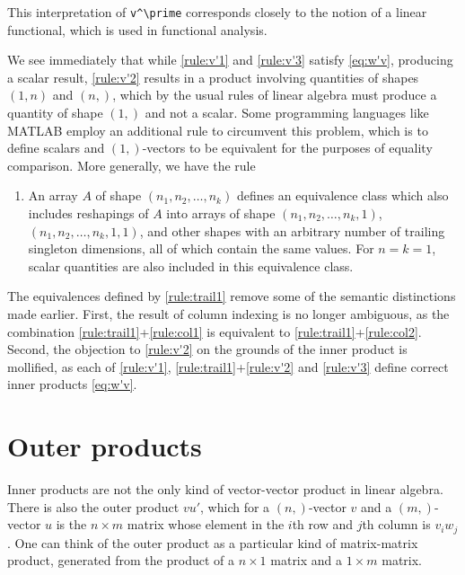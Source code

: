 This interpretation of \lstinline|v^\prime| corresponds closely to the notion of a
linear functional, which is used in functional analysis.

We see immediately that while \ref{rule:v'1} and \ref{rule:v'3} satisfy
\eqref{eq:w'v}, producing a scalar result, \ref{rule:v'2} results in a product
involving quantities of shapes $(1,n)$ and $(n,)$, which by the usual rules of
linear algebra must produce a quantity of shape $(1,)$ and not a scalar. Some
programming languages like MATLAB employ an additional rule to circumvent this
problem, which is to define scalars and $(1,)$-vectors to be equivalent for the
purposes of equality comparison. More generally, we have the rule

\begin{enumerate}[label=\bfseries{}I\arabic*]
\item An array $A$ of shape $(n_1, n_2, \dots, n_k)$ defines an equivalence
class which also includes reshapings of $A$ into arrays of shape $(n_1, n_2,
\dots, n_k, 1)$, $(n_1, n_2, \dots, n_k, 1, 1)$, and other shapes with an
arbitrary number of trailing singleton dimensions, all of which contain the
same values. For $n = k = 1$, scalar quantities are also included in this
equivalence class.\label{rule:trail1}
\end{enumerate}

The equivalences defined by \ref{rule:trail1} remove some of the semantic
distinctions made earlier. First, the result of column indexing is no longer
ambiguous, as the combination \ref{rule:trail1}+\ref{rule:col1} is equivalent
to \ref{rule:trail1}+\ref{rule:col2}. Second, the objection to \ref{rule:v'2}
on the grounds of the inner product is mollified, as each of
\ref{rule:v'1}, \ref{rule:trail1}+\ref{rule:v'2} and \ref{rule:v'3} define
correct inner products \eqref{eq:w'v}.



\section{Outer products}

Inner products are not the only kind of vector-vector product in linear
algebra. There is also the outer product $vu'$, which for a $(n,)$-vector $v$
and a $(m,)$-vector $u$ is the $n \times m$ matrix whose element in the $i$th
row and $j$th column is $v_i w_j$. One can think of the outer product as a
particular kind of matrix-matrix product, generated from the product of a $n
\times 1$ matrix and a $1 \times m$ matrix.

